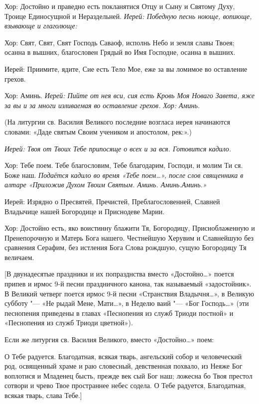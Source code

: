   Хор:\normalfont{} Достойно и праведно есть покланятися Отцу и Сыну и Святому Духу, Троице Единосущной и Нераздельней. \itshape  Иерей:\normalfont{} Победную песнь ноюще, вопиюще, взывающе и глаголюще: \itshape 


  Хор:\normalfont{} Свят, Свят, Свят Господь Саваоф, исполнь Небо и земля славы Твоея; осанна в вышних, благословен Грядый во Имя Господне, осанна в вышних. \itshape 


  Иерей:\normalfont{} Приимите, ядите, Сие есть Тело Мое, еже за вы ломимое во оставление грехов. \itshape 


  Хор:\normalfont{} Аминь. \itshape  Иерей:\normalfont{} Пийте от нея вси, сия есть Кровь Моя Новаго Завета, яже за вы и за многи изливаемая во оставление грехов. \itshape  Хор:\normalfont{} Аминь. 


  (На литургии св. Василия Великого последние возгласа иерея начинаются словами: «Даде святым Своим учеником и апостолом, рек:».)


\itshape  Иерей:\normalfont{} Твоя от Твоих Тебе припосяще о всех и за вся. \itshape  Готовится кадило\normalfont{}. \itshape 


Хор:\normalfont{} Тебе поем. Тебе благословим, Тебе благодарим, Господи, и молим Ти ся. Боже наш. \itshape  Подаётся кадило во время «Тебе поем…», после слов священника в алтаре «Приложив Духом Твоим Святым. Аминь. Аминь.Аминь.\normalfont{}»  \itshape 


  Иерей:\normalfont{} Изрядно о Пресвятей, Пречистей, Преблагословенней, Славней Владычице нашей Богородице и Приснодеве Марии. \itshape 


Хор:\normalfont{} Достойно есть, яко воистинну блажити Тя, Богородицу, Присноблаженную и Пренепорочную и Матерь Бога нашего. Честнейшую Херувим и Славнейшую без сравнения Серафим, без истления Бога Слова рождшую, сущую Богородицу Тя величаем. 


 [В двунадесятые праздники и их попразднства вместо «Достойно…» поется припев и ирмос 9-й песни праздничного канона, так называемый «задостойник». В Великий четверг поется ирмос 9-й песни «Странствия Владычня…», в Великую субботу "--- «Не рыдай Мене, Мати…», в Неделю ваий "--- «Бог Господь…» (эти песнопения приведены в главах «Песнопения из служб Триоди постной» и «Песнопения из служб Триоди цветной»).


 Если же литургия св. Василия Великого, вместо «Достойно…» поем: 


      О Тебе радуется. Благодатная, всякая тварь, ангельский собор и человеческий род, освященный храме и раю словесный, девственная похвало, из Неяже Бог воплотися и Младенец бысть, прежде век сый Бог наш; ложесна бо Твоя престол сотвори и чрево Твое пространнее небес содела. О Тебе радуется, Благодатная, всякая тварь, слава Тебе.]


